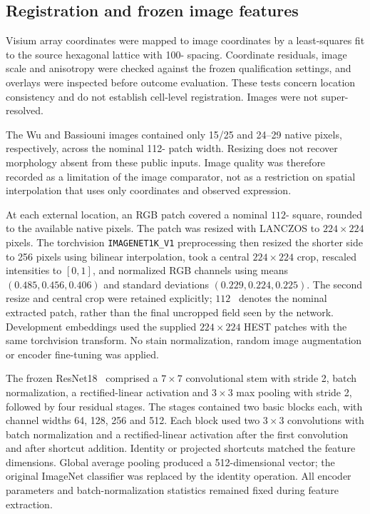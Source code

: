\subsection{Registration and frozen image features}\label{sec:registration}
Visium array coordinates were mapped to image coordinates by a least-squares fit to the source hexagonal lattice with 100-\um{} spacing. Coordinate residuals, image scale and anisotropy were checked against the frozen qualification settings, and overlays were inspected before outcome evaluation. These tests concern location consistency and do not establish cell-level registration. Images were not super-resolved.

The Wu and Bassiouni images contained only 15/25 and 24--29 native pixels, respectively, across the nominal 112-\um{} patch width. Resizing does not recover morphology absent from these public inputs. Image quality was therefore recorded as a limitation of the image comparator, not as a restriction on spatial interpolation that uses only coordinates and observed expression.

At each external location, an RGB patch covered a nominal $112$-\um{} square, rounded to the available native pixels. The patch was resized with LANCZOS to $224\times224$ pixels. The torchvision \texttt{IMAGENET1K\_V1} preprocessing then resized the shorter side to 256 pixels using bilinear interpolation, took a central $224\times224$ crop, rescaled intensities to $[0,1]$, and normalized RGB channels using means $(0.485, 0.456, 0.406)$ and standard deviations $(0.229, 0.224, 0.225)$. The second resize and central crop were retained explicitly; $112$~\um{} denotes the nominal extracted patch, rather than the final uncropped field seen by the network. Development embeddings used the supplied $224\times224$ HEST patches with the same torchvision transform. No stain normalization, random image augmentation or encoder fine-tuning was applied.

The frozen ResNet18~\cite{he2016} comprised a $7\times7$ convolutional stem with stride 2, batch normalization, a rectified-linear activation and $3\times3$ max pooling with stride 2, followed by four residual stages. The stages contained two basic blocks each, with channel widths 64, 128, 256 and 512. Each block used two $3\times3$ convolutions with batch normalization and a rectified-linear activation after the first convolution and after shortcut addition. Identity or projected shortcuts matched the feature dimensions. Global average pooling produced a 512-dimensional vector; the original ImageNet classifier was replaced by the identity operation. All encoder parameters and batch-normalization statistics remained fixed during feature extraction.

